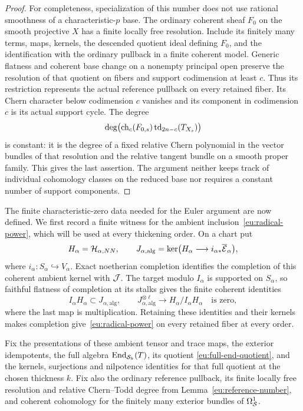 \begin{proof}
For completeness, specialization of this number does not use rational
smoothness of a characteristic-$p$ base.  The ordinary coherent sheaf
$F_0$ on the smooth projective $X$ has a finite locally free resolution.
Include its finitely many terms, maps, kernels, the descended quotient
ideal defining $F_0$, and the identification with the ordinary pullback
in a finite coherent model.  Generic flatness and coherent base change
on a nonempty principal open preserve the resolution of that quotient
on fibers and support codimension at least $c$.  Thus its restriction
represents the actual reference pullback on every retained fiber.  Its
Chern character below codimension $c$ vanishes and its component in
codimension $c$ is its actual support
cycle.  The degree
\[
 \deg\bigl(\operatorname{ch}_c(F_{0,s})\operatorname{td}_{2n-c}(T_{X_s})\bigr)
\]
is constant: it is the degree of a fixed relative Chern polynomial in
the vector bundles of that resolution and the relative tangent bundle
on a smooth proper family.  This gives the last assertion.  The
argument neither keeps track of individual cohomology classes on the
reduced base nor requires a constant number of support components.
\end{proof}

The finite characteristic-zero data needed for the Euler argument are
now defined.  We first record a finite witness for the ambient
inclusion~\eqref{eu:radical-power}, which will be used at every
thickening order.  On a chart put
\[
 H_\alpha=\mathcal H_{\alpha,NN},\qquad
 J_{\alpha,\mathrm{alg}}
   =\ker\bigl(H_\alpha\longrightarrow i_{\alpha*}
                                      \overline{\mathcal E}_\alpha\bigr),
\]
where $i_\alpha:S_\alpha\hookrightarrow V_\alpha$.
Exact noetherian completion identifies the completion of this coherent
ambient kernel with $\mathcal J$.  The target modulo $I_\alpha$ is supported
on $S_\alpha$, so faithful flatness of completion at its stalks gives
the finite coherent identities
\[
 I_\alpha H_\alpha\subset J_{\alpha,\mathrm{alg}},\qquad
 J_{\alpha,\mathrm{alg}}^{\otimes\ell}
        \longrightarrow H_\alpha/I_\alpha H_\alpha
        \quad\text{is zero},
\]
where the last map is multiplication.  Retaining these identities and
their kernels makes completion give~\eqref{eu:radical-power} on every
retained fiber at every order.

Fix the presentations of these ambient tensor and trace maps, the
exterior idempotents, the full algebra $\operatorname{End}_{\mathcal S_k}(T)$, its quotient
\eqref{eu:full-end-quotient}, and the kernels, surjections and
nilpotence identities for that full quotient at the chosen thickness
$k$.
Fix also the ordinary reference pullback, its finite locally free
resolution and relative Chern--Todd degree from
Lemma~\ref{eu:reference-number}, and coherent cohomology for the
finitely many exterior bundles of $\Omega^1_{\mathcal S}$.

